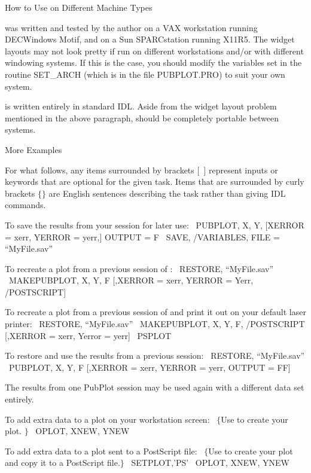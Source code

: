 \vskip 3mm \centerline{\rmtwelve How to Use on Different Machine Types}

\pubplot was written and tested by the author on a VAX workstation running 
DECWindows Motif, and on a Sun SPARCstation running X11R5.  The \pubplot widget
layouts may not look pretty if run on different workstations and/or with 
different windowing systems.  If this is the case, you 
should modify the variables set in the routine SET\_ARCH (which is in the file
PUBPLOT.PRO) to suit your own system.  

\pubplot is written entirely in standard IDL.  Aside from the widget layout
problem mentioned in the above paragraph, \pubplot should be completely 
portable between systems.  

\vskip 3mm \centerline{\rmtwelve More Examples}

For what follows, any items surrounded by brackets [\ ] represent inputs or 
keywords that are optional for the given task.  Items that are surrounded by
curly brackets $\{\} $ are English sentences describing the task rather than 
giving IDL commands.

\noindent To save the results from your \pubplot session for later use:
\idl\ PUBPLOT, X, Y, [XERROR = xerr, YERROR = yerr,] OUTPUT = F
\idl\ SAVE, /VARIABLES, FILE = ``MyFile.sav''

\noindent To recreate a plot from a previous session of \pubplot:
\idl\ RESTORE, ``MyFile.sav''
\idl\ MAKEPUBPLOT, X, Y, F [,XERROR = xerr, YERROR = Yerr, /POSTSCRIPT]

\noindent To recreate a plot from a previous session of \pubplot and print it out on your
default laser printer:
\idl\ RESTORE, ``MyFile.sav''
\idl\ MAKEPUBPLOT, X, Y, F, /POSTSCRIPT [,XERROR = xerr, Yerror = yerr]
\idl\ PSPLOT

\noindent To restore and use the results from a previous \pubplot session:
\idl\ RESTORE, ``MyFile.sav''
\idl\ PUBPLOT, X, Y, F [,XERROR = xerr, YERROR = yerr, OUTPUT = FF]

\noindent The results from one PubPlot session may be used again with a 
different data set entirely.

\noindent To add extra data to a plot on your workstation screen:
\idl\ $\{ $Use \pubplot to create your plot. $\} $
\idl\ OPLOT, XNEW, YNEW

\noindent To add extra data to a plot sent to a PostScript file:
\idl\ $\{ $Use \pubplot to create your plot and copy it to a PostScript file.$\} $
\idl\ SETPLOT,'PS'
\idl\ OPLOT, XNEW, YNEW

